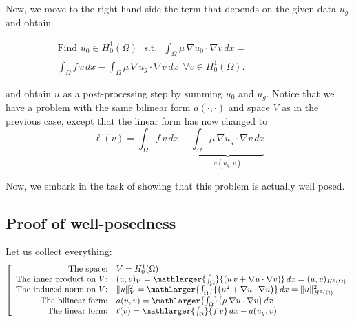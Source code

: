 Now, we move to the right hand side the term that depends on the given data $u_g$
and obtain
\begin{kaobox}[frametitle=Weak form of Poisson's problem with $g \ne 0$]
\vspace{-0.25cm}
\begin{eqnarray}
\mbox{Find $u_0 \in H^1_0(\Omega)$~~s.t.~~} \int_{\Omega}{\mu\,\nabla{u_0}\cdot \nabla{v}}\,dx =~~~~~~~~~~~~~~~~~~~~~~~~~\nonumber \\
        \int_{\Omega}{f\,v} \,dx - \int_{\Omega}{\mu\,\nabla{u_g} \cdot \nabla{v}} \,dx~~\forall v \in H^1_0(\Omega). \nonumber
\end{eqnarray}
\end{kaobox}
and obtain $u$ as a post-processing step by summing $u_0$ and $u_g$.
Notice that we have a problem with the same bilinear form
$a(\cdot,\cdot)$ and space $V$ as in the previous case, except that the linear
form has now changed to
\begin{equation}
\ell(v) = \int_{\Omega}{f\,v} \,dx - \underbrace{\int_{\Omega}{\mu\,\nabla{u_g} \cdot \nabla{v}} \,dx}_{a(u_g,v)}
\end{equation}

Now, we embark in the task of showing that this problem is actually well posed.

\subsection{Proof of well-posedness}

Let us collect everything:
\begin{equation}
\left[
\begin{array}{rl}
  \mbox{The space:} & V = H_0^1(\Omega) \nonumber \\
  \mbox{The inner product on $V$:} & (u,v)_V = \mathlarger{\int_{\Omega}}{\left ( u \, v + \nabla{u}\cdot \nabla{v}\right)}\,dx = (u,v)_{H^1(\Omega)} \nonumber \\
  \mbox{The induced norm on $V$:} & \lVert u \rVert^2_V = \mathlarger{\int_{\Omega}}{\left ( u^2 + \nabla{u}\cdot \nabla{u}\right)}\,dx = \lVert u \rVert^2_{H^1(\Omega)} \nonumber \\
  \mbox{The bilinear form:} & a(u,v) = \mathlarger{\int_{\Omega}}{\mu\,\nabla{u}\cdot \nabla{v}}\,dx \nonumber \\
  \mbox{The linear form:} & \ell(v) = \mathlarger{\int_{\Omega}}{f\,v} \,dx - a(u_g,v) \nonumber
\end{array}
\right.
\end{equation}

